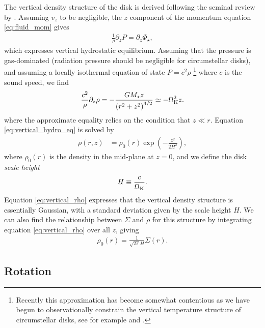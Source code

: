 The vertical density structure of the disk is derived following the seminal review by \citet{pringle1981}.
Assuming $v_z$ to be negligible, the $z$ component of the momentum equation \ref{eq:fluid_mom} gives
\begin{align}
    \frac{1}{\rho} \partial_z P = \partial_z \Phi_\star,
\end{align}
which expresses vertical hydrostatic equilibrium.
Assuming that the pressure is gas-dominated (radiation pressure should be negligible for circumstellar disks), and assuming a locally isothermal equation of state $P=c^2 \rho$ \footnote{Recently this approximation has become somewhat contentious as we have begun to observationally constrain the vertical temperature structure of circumstellar disks, see for example \citet{pinte2018} and \citet{calahan2021}.} where $c$ is the sound speed, we find 
\begin{align}
    \frac{c^2}{\rho} \partial_z \rho = - \frac{G M_\star z}{\left(r^2 + z^2\right)^{3/2}} \simeq - \Omega_{\rm K}^2 z. \label{eq:vertical_hydro_eq}
\end{align}
where the approximate equality relies on the condition that $z \ll r$.
Equation \ref{eq:vertical_hydro_eq} is solved by
\begin{align}
    \rho(r,z) &= \rho_0(r) \exp{\left( -\frac{z^2}{2 H^2} \right)}, \label{eq:vertical_rho}
\end{align}
where $\rho_0(r)$ is the density in the mid-plane at $z=0$, and we define the disk \textit{scale height}
\begin{align}
    H \equiv\frac{c}{\Omega_{\rm K}}.
\end{align}
Equation \ref{eq:vertical_rho} expresses that the vertical density structure is essentially Gaussian, with a standard deviation given by the scale height $H$.
We can also find the relationship between $\Sigma$ and $\rho$ for this structure by integrating equation \ref{eq:vertical_rho} over all $z$, giving
\begin{align}
    \rho_0(r) = \frac{1}{\sqrt{2\pi} H} \Sigma(r). \label{eq:surf_dens_to_dens}
\end{align}

\subsection{Rotation} \label{sec:disk_rotation}

